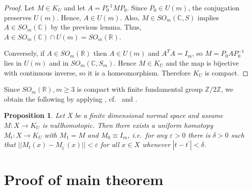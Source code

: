 \documentclass[11pt]{amsart}
\newtheorem{proposition}[theorem]{Proposition}
\theoremstyle{definition}
\theoremstyle{remark}
\theoremstyle{remark}
\begin{document}
\begin{proof}
Let $M\in K_U$ and let $A=P_0^{-1}MP_0$. Since $P_0\in U(m)$, the conjugation preserves $U(m)$. Hence,
$A\in U(m)$. Also, $M\in SO_{m}(\mathbb{C}, S)$ implies $A\in SO_{m}(\mathbb C)$ by the previous lemma.
Thus, $A\in SO_{m}(\mathbb C)\cap U(m)=SO_{m}(\mathbb R)$.

Conversely, if $A\in SO_{m}(\mathbb R)$ then $A\in U(m)$ and $A^T A=I_m$, so $M=P_0 A P_0^{-1}$ lies in
$U(m)$ and in $SO_{m}(\mathbb{C}, S_m)$. Hence $M \in K_U$ and the map is bijective with continuous inverse,
so it is a homeomorphism. Therefore $K_U$ is compact.
\end{proof}
Since $SO_{m}(\mathbb{R}), m \ge 3$ is compact with finite fundamental group $\mathbb{Z}/2\mathbb{Z}$, we obtain the following by applying \cite[Theorem 1]{MR0458416} , cf.\ \cite{03707400} and \cite[Proof of Theorem 2]{04073958}.

\begin{proposition}\label{Cardel-Siegel}
Let X be a finite dimensional normal space and
assume $M : X \longrightarrow K_{U}$ is nullhomotopic. Then there exists a uniform homotopy $M_t : X \longrightarrow K_{U}$ with $M_1 = M$ and $M_0 \equiv I_m$, i.e.\ for any $\varepsilon > 0$ there is $\delta > 0$ such that $||M_t(x) - M_{t^{\prime}}(x)|| < \varepsilon$ for all $x \in X$ whenever $|t - t^{\prime}| < \delta$.
\end{proposition}

\section{Proof of main theorem} \label{sec:combine}
\end{document}
